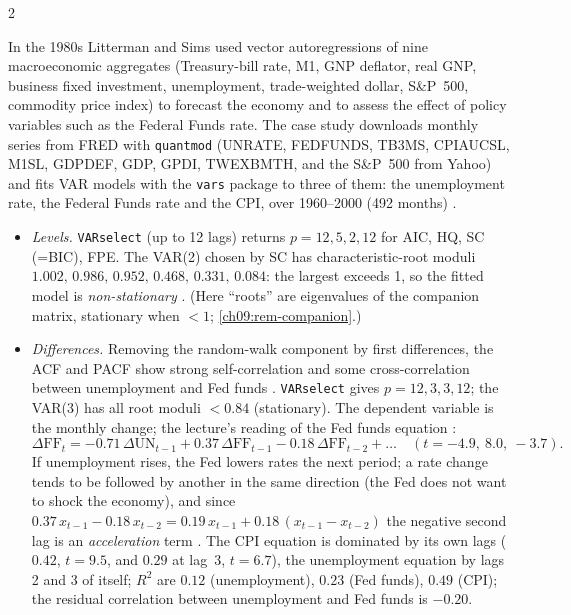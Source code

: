 \begin{paracol}{2}
\begin{casestudy}\label{ch09:cs-5}
In the 1980s Litterman and Sims used vector autoregressions of nine macroeconomic aggregates (Treasury-bill rate, M1, GNP deflator, real GNP,
business fixed investment, unemployment, trade-weighted dollar, S\&P~500, commodity price index) to forecast the economy and to assess
the effect of policy variables such as the Federal Funds rate. The case study downloads monthly series from FRED with
\texttt{quantmod} (UNRATE, FEDFUNDS, TB3MS, CPIAUCSL, M1SL, GDPDEF, GDP, GPDI, TWEXBMTH, and the S\&P~500 from Yahoo) and fits VAR models with the
\texttt{vars} package to three of them: the unemployment rate, the Federal Funds rate and the CPI, over 1960--2000 (492 months)
.
\begin{itemize}
  \item \emph{Levels.} \texttt{VARselect} (up to 12 lags) returns $p=12,5,2,12$ for AIC, HQ, SC (=BIC), FPE. The VAR(2) chosen by SC has
        characteristic-root moduli $1.002,\,0.986,\,0.952,\,0.468,\,0.331,\,0.084$: the largest exceeds 1, so the fitted model is
        \emph{non-stationary} . (Here ``roots'' are eigenvalues of the companion matrix, stationary when $<1$;
        \cref{ch09:rem-companion}.)
  \item \emph{Differences.} Removing the random-walk component by first differences, the ACF and PACF show strong self-correlation and some cross-correlation between
        unemployment and Fed funds . \texttt{VARselect} gives $p=12,3,3,12$; the VAR(3) has
        all root moduli $<0.84$ (stationary). The dependent variable is the monthly change; the lecture's reading of the Fed funds equation
        :
        \[
          \Delta\mathrm{FF}_t=-0.71\,\Delta\mathrm{UN}_{t-1}+0.37\,\Delta\mathrm{FF}_{t-1}-0.18\,\Delta\mathrm{FF}_{t-2}+\dots\quad(t=-4.9,\ 8.0,\ -3.7).
        \]
        If unemployment rises, the Fed lowers rates the next period; a rate change tends to be followed by another in the same direction
        (the Fed does not want to shock the economy), and since $0.37\,x_{t-1}-0.18\,x_{t-2}=0.19\,x_{t-1}+0.18\,(x_{t-1}-x_{t-2})$ the
        negative second lag is an \emph{acceleration} term . The CPI equation is dominated by its own lags
        ($0.42$, $t=9.5$, and $0.29$ at lag~3, $t=6.7$), the unemployment equation by lags 2 and 3 of itself; $R^2$ are $0.12$ (unemployment),
        $0.23$ (Fed funds), $0.49$ (CPI); the residual correlation between unemployment and Fed funds is $-0.20$.

\end{itemize}
\end{casestudy}
\end{paracol}

